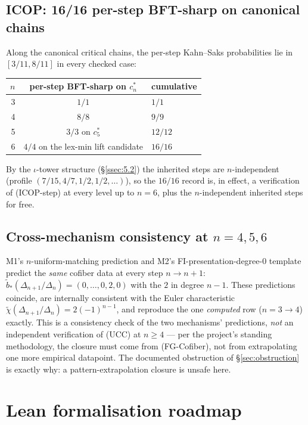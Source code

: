 \documentclass[11pt,reqno]{amsart}
\theoremstyle{plain}
\theoremstyle{definition}
\newcommand{\bred}{\widetilde b}
\newcommand{\chired}{\widetilde\chi}
\newcommand{\cstar}[1]{c^{*}_{#1}}
\newcommand{\UCC}{\textup{(UCC)}}
\newcommand{\FGC}{\textup{(FG-Cofiber)}}
\newcommand{\ICOPstep}{\textup{(ICOP-step)}}
\begin{document}
\subsection{ICOP: 16/16 per-step BFT-sharp on canonical chains}\label{ssec:9.3}
Along the canonical critical chains, the per-step Kahn--Saks
probabilities lie in $[3/11,8/11]$ in every checked case:
\begin{center}
\begin{tabular}{r c l}
\toprule
$n$ & per-step BFT-sharp on $\cstar n$ & cumulative \\
\midrule
3 & $1/1$ & $1/1$ \\
4 & $8/8$ & $9/9$ \\
5 & $3/3$ on $\cstar5$ & $12/12$ \\
6 & $4/4$ on the lex-min lift candidate & $16/16$ \\
\bottomrule
\end{tabular}
\end{center}
By the $\iota$-tower structure (\S\ref{ssec:5.2}) the inherited steps
are $n$-independent (profile $(7/15,4/7,1/2,1/2,\dots)$), so the $16/16$
record is, in effect, a verification of \ICOPstep{} at every level up
to $n=6$, plus the $n$-independent inherited steps for free.

\subsection{Cross-mechanism consistency at $n=4,5,6$}\label{ssec:9.4}
M1's $n$-uniform-matching prediction and M2's
FI-presentation-degree-$0$ template predict the \emph{same} cofiber
data at every step $n\to n+1$: $\bred_*(\Delta_{n+1}/\Delta_n)
=(0,\dots,0,2,0)$ with the $2$ in degree $n-1$. These predictions
coincide, are internally consistent with the Euler characteristic
$\chired(\Delta_{n+1}/\Delta_n)=2(-1)^{n-1}$, and reproduce the one
\emph{computed} row ($n=3\to4$) exactly. This is a consistency check of
the two mechanisms' predictions, \emph{not} an independent verification
of \UCC{} at $n\ge4$ --- per the project's standing methodology, the
closure must come from \FGC, not from extrapolating one more empirical
datapoint. The documented obstruction of \S\ref{sec:obstruction} is
exactly why: a pattern-extrapolation closure is unsafe here.

\appendix
\section{Lean formalisation roadmap}\label{app:lean}
\end{document}
